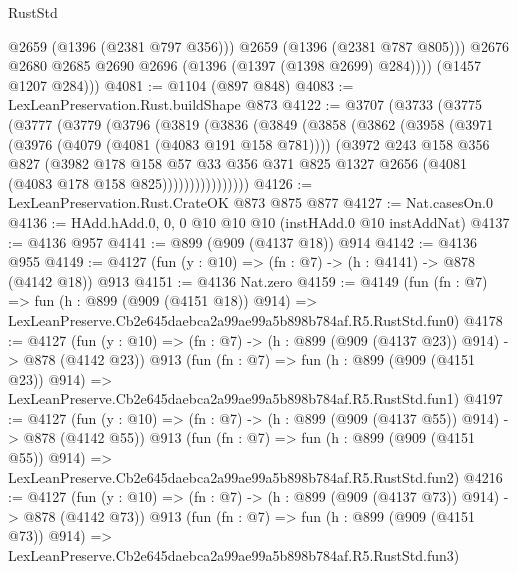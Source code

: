 \begin{lexlean}{RustStd}
\begin{coremodule}
                @2659
                (@1396 (@2381 @797 @356)))
              @2659
              (@1396 (@2381 @787 @805)))
            @2676
            @2680
            @2685
            @2690
            @2696
            (@1396 (@1397 (@1398 @2699) @284))))
        (@1457 @1207 @284)))
@4081 := @1104 (@897 @848)
@4083 := LexLeanPreservation.Rust.buildShape @873
@4122 := @3707
    (@3733
      (@3775
        (@3777
          (@3779
            (@3796
              (@3819
                (@3836
                  (@3849
                    (@3858
                      (@3862
                        (@3958
                          (@3971
                            (@3976 (@4079 (@4081 (@4083 @191 @158 @781))))
                            (@3972
                              @243
                              @158
                              @356
                              @827
                              (@3982
                                @178
                                @158
                                @57
                                @33
                                @356
                                @371
                                @825
                                @1327
                                @2656
                                (@4081 (@4083 @178 @158 @825))))))))))))))))
@4126 := LexLeanPreservation.Rust.CrateOK @873 @875 @877
@4127 := Nat.casesOn.{0}
@4136 := HAdd.hAdd.{0, 0, 0} @10 @10 @10 (instHAdd.{0} @10 instAddNat)
@4137 := @4136 @957
@4141 := @899 (@909 (@4137 @18)) @914
@4142 := @4136 @955
@4149 := @4127 (fun (y : @10) => (fn : @7) -> (h : @4141) -> @878 (@4142 @18)) @913
@4151 := @4136 Nat.zero
@4159 := @4149
    (fun (fn : @7) =>
    fun (h : @899 (@909 (@4151 @18)) @914) =>
    LexLeanPreserve.Cb2e645daebca2a99ae99a5b898b784af.R5.RustStd.fun0)
@4178 := @4127
    (fun (y : @10) => (fn : @7) -> (h : @899 (@909 (@4137 @23)) @914) -> @878 (@4142 @23))
    @913
    (fun (fn : @7) =>
    fun (h : @899 (@909 (@4151 @23)) @914) =>
    LexLeanPreserve.Cb2e645daebca2a99ae99a5b898b784af.R5.RustStd.fun1)
@4197 := @4127
    (fun (y : @10) => (fn : @7) -> (h : @899 (@909 (@4137 @55)) @914) -> @878 (@4142 @55))
    @913
    (fun (fn : @7) =>
    fun (h : @899 (@909 (@4151 @55)) @914) =>
    LexLeanPreserve.Cb2e645daebca2a99ae99a5b898b784af.R5.RustStd.fun2)
@4216 := @4127
    (fun (y : @10) => (fn : @7) -> (h : @899 (@909 (@4137 @73)) @914) -> @878 (@4142 @73))
    @913
    (fun (fn : @7) =>
    fun (h : @899 (@909 (@4151 @73)) @914) =>
    LexLeanPreserve.Cb2e645daebca2a99ae99a5b898b784af.R5.RustStd.fun3)

\end{coremodule}
\end{lexlean}
